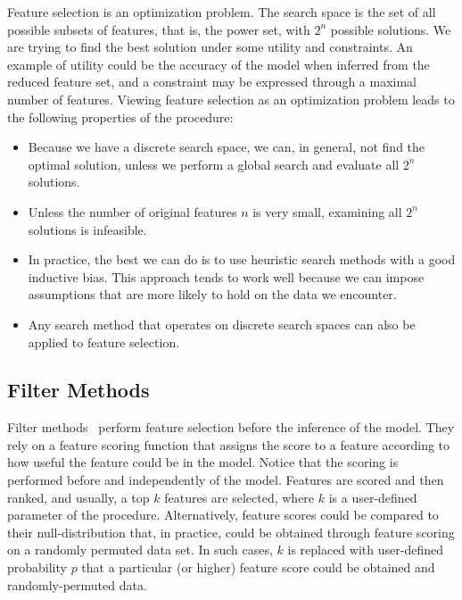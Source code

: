 \begin{refsection}
Feature selection is an optimization problem. The search space is the set of all possible subsets of features, that is, the power set, with $2^n$ possible solutions. We are trying to find the best solution under some utility and constraints. An example of utility could be the accuracy of the model when inferred from the reduced feature set, and a constraint may be expressed through a maximal number of features. Viewing feature selection as an optimization problem leads to the following properties of the procedure:
\begin{itemize}
\item Because we have a discrete search space, we can, in general, not find the optimal solution, unless we perform a global search and evaluate all $2^n$ solutions.
\item Unless the number of original features $n$ is very small, examining all $2^n$ solutions is infeasible.
\item In practice, the best we can do is to use heuristic search methods with a good inductive bias. This approach tends to work well because we can impose assumptions that are more likely to hold on the data we encounter.
\item Any search method that operates on discrete search spaces can also be applied to feature selection.
\end{itemize}

\subsection*{Filter Methods}

Filter methods~\citep{Guyon2003} perform feature selection before the inference of the model. They rely on a feature scoring function that assigns the score to a feature according to how useful the feature could be in the model. Notice that the scoring is performed before and independently of the model. Features are scored and then ranked, and usually, a top $k$ features are selected, where $k$ is a user-defined parameter of the procedure. Alternatively, feature scores could be compared to their null-distribution that, in practice, could be obtained through feature scoring on a randomly permuted data set. In such cases, $k$ is replaced with user-defined probability $p$ that a particular (or higher) feature score could be obtained and randomly-permuted data.


\end{refsection}

